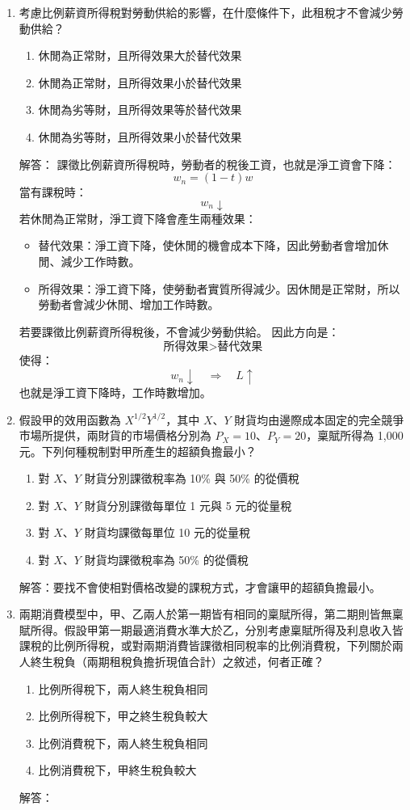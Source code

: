 \documentclass[12pt, a4paper]{article}
\begin{document}
\begin{enumerate}
    \item 考慮比例薪資所得稅對勞動供給的影響，在什麼條件下，此租稅才不會減少勞動供給？
    \begin{enumerate}[label=\Alph*.]
        \item 休閒為正常財，且所得效果大於替代效果
        \item 休閒為正常財，且所得效果小於替代效果
        \item 休閒為劣等財，且所得效果等於替代效果
        \item 休閒為劣等財，且所得效果小於替代效果
    \end{enumerate}
    解答：
    課徵比例薪資所得稅時，勞動者的稅後工資，也就是淨工資會下降：
    \[
    w_n = (1-t)w
    \]
    當有課稅時：
    \[
    w_n \downarrow
    \]
    若休閒為正常財，淨工資下降會產生兩種效果：
    \begin{itemize}
        \item 替代效果：淨工資下降，使休閒的機會成本下降，因此勞動者會增加休閒、減少工作時數。
        \item 所得效果：淨工資下降，使勞動者實質所得減少。因休閒是正常財，所以勞動者會減少休閒、增加工作時數。
    \end{itemize}
    若要課徵比例薪資所得稅後，不會減少勞動供給。
    因此方向是：
    \[
    \text{所得效果} > \text{替代效果}
    \]
    使得：
    \[
    w_n \downarrow \quad \Rightarrow \quad L \uparrow
    \]
    也就是淨工資下降時，工作時數增加。

    \item 假設甲的效用函數為 \(X^{1/2} Y^{1/2}\)，其中 \(X\)、\(Y\) 財貨均由邊際成本固定的完全競爭市場所提供，兩財貨的市場價格分別為 \(P_X = 10\)、\(P_Y = 20\)，稟賦所得為 1,000 元。下列何種稅制對甲所產生的超額負擔最小？
    \begin{enumerate}[label=\Alph*.]
        \item 對 \(X\)、\(Y\) 財貨分別課徵稅率為 10\% 與 50\% 的從價稅
        \item 對 \(X\)、\(Y\) 財貨分別課徵每單位 1 元與 5 元的從量稅
        \item 對 \(X\)、\(Y\) 財貨均課徵每單位 10 元的從量稅
        \item 對 \(X\)、\(Y\) 財貨均課徵稅率為 50\% 的從價稅
    \end{enumerate}
    解答：要找不會使相對價格改變的課稅方式，才會讓甲的超額負擔最小。

    \item 兩期消費模型中，甲、乙兩人於第一期皆有相同的稟賦所得，第二期則皆無稟賦所得。假設甲第一期最適消費水準大於乙，分別考慮稟賦所得及利息收入皆課稅的比例所得稅，或對兩期消費皆課徵相同稅率的比例消費稅，下列關於兩人終生稅負（兩期租稅負擔折現值合計）之敘述，何者正確？
    \begin{enumerate}[label=\Alph*.]
        \item 比例所得稅下，兩人終生稅負相同
        \item 比例所得稅下，甲之終生稅負較大
        \item 比例消費稅下，兩人終生稅負相同
        \item 比例消費稅下，甲終生稅負較大
    \end{enumerate}
    解答：


\end{enumerate}
\end{document}
